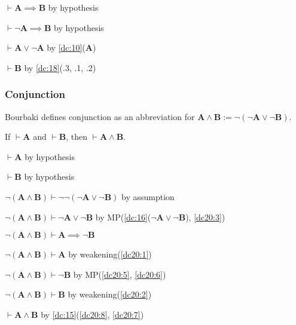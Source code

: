\documentclass{amsart}%
\newcommand\metavariable[1]{\boldsymbol{#1}}
\begin{document}
\begin{pf}
\item $\vdash\metavariable{A}\implies\metavariable{B}$ by hypothesis
\item $\vdash\neg\metavariable{A}\implies\metavariable{B}$ by hypothesis
\item $\vdash\metavariable{A}\lor\neg\metavariable{A}$ by \ref{dc:10}($\metavariable{A}$)
\item $\vdash\metavariable{B}$ by \ref{dc:18}(.3, .1, .2)
\end{pf}


\subsubsection{Conjunction}

\begin{definition}
Bourbaki defines conjunction as an abbreviation for $\metavariable{A}\land\metavariable{B}:=\neg(\neg\metavariable{A}\lor\neg\metavariable{B})$.
\end{definition}

\begin{dc}\label{dc:20}
If $\vdash\metavariable{A}$ and $\vdash\metavariable{B}$,
then $\vdash\metavariable{A}\land\metavariable{B}$.
\end{dc}

\begin{pf}
\item\label{dc20:1} $\vdash\metavariable{A}$ by hypothesis
\item\label{dc20:2} $\vdash\metavariable{B}$ by hypothesis
\item\label{dc20:3} $\neg(\metavariable{A}\land\metavariable{B})\vdash\neg\neg(\neg\metavariable{A}\lor\neg\metavariable{B})$
  by assumption
\item\label{dc20:4} $\neg(\metavariable{A}\land\metavariable{B})\vdash\neg\metavariable{A}\lor\neg\metavariable{B}$
  by MP(\ref{dc:16}($\neg\metavariable{A}\lor\neg\metavariable{B}$), \ref{dc20:3})
\item\label{dc20:5} $\neg(\metavariable{A}\land\metavariable{B})\vdash\metavariable{A}\implies\neg\metavariable{B}$
\item\label{dc20:6} $\neg(\metavariable{A}\land\metavariable{B})\vdash\metavariable{A}$
  by weakening(\ref{dc20:1})
\item\label{dc20:7} $\neg(\metavariable{A}\land\metavariable{B})\vdash\neg\metavariable{B}$
  by MP(\ref{dc20:5}, \ref{dc20:6})
\item\label{dc20:8} $\neg(\metavariable{A}\land\metavariable{B})\vdash\metavariable{B}$
  by weakening(\ref{dc20:2})
\item\label{dc20:9} $\vdash\metavariable{A}\land\metavariable{B}$
  by \ref{dc:15}(\ref{dc20:8}, \ref{dc20:7})
\end{pf}
\end{document}
